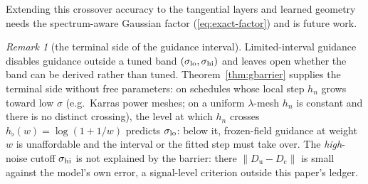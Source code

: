 \documentclass{article} %
\def\eqref#1{equation~\ref{#1}}
\theoremstyle{plain}
\theoremstyle{definition}
\theoremstyle{remark}
\newtheorem{remark}{Remark}
\providecommand{\eexp}{\mathrm{e}}
\providecommand{\Dc}{D_{\mathrm{c}}}
\providecommand{\Du}{D_{\mathrm{u}}}
\def\eqref#1{(\ref{#1})}
\begin{document}
\newcommand{\ProofGCrossAP}{%
On $a=0$ the exact one-step factor (Lemma~\ref{lem:gfactor}) is
$\Phi_n=r^{1+w}\bigl((1+u_n)/(1+r^2u_n)\bigr)^{w/2}$, with $u_n=\sigma_n^2/b$,
$r=\eexp^{-h}$; the fitted factor (Proposition~\ref{prop:gfit-sign}, $A=1$) is
$G_n=\eexp^{-h}(u_n+\eexp^{-wh})/(1+u_n)$.  Writing $y_n=\log u_n$,
$\delta(h,y):=\log(G_n/\Phi_n)
= wh+\log(\eexp^{y}+\eexp^{-wh})-\bigl(1+\tfrac w2\bigr)\log(1+\eexp^{y})
+\tfrac w2\log(1+\eexp^{y-2h})$.
Then $\delta(0,y)=\partial_h\delta(0,y)=0$ (first-order consistency,
Proposition~\ref{prop:gconsist}), and with $F(y)=\eexp^{y}/(1+\eexp^{y})^2$
one has $\partial_h^2\delta=w^2F(y+wh)+2wF(y-2h)\ge0$; hence $\delta\ge0$, so
$\Theta_K=\prod_n\eexp^{\delta(h,y_n)}\ge1$, and Taylor's formula gives
$\delta(h,y_n)=\int_0^h(h-s)\bigl[w^2F(y_n+ws)+2wF(y_n-2s)\bigr]\,ds$.
On the uniform mesh $y_{n+1}=y_n-2h$; since $\int F=1$ and
$\mathrm{TV}(F)=\tfrac12$, the rectangle bound gives $2h\sum_n F(y_n+c)\le1+h$
for every shift $c$, so
$\log\Theta_K\le\int_0^h(h-s)\tfrac{1+h}{2h}(w^2+2w)\,ds=\tfrac{1+h}{4}w(w+2)h$.
Synchronous coupling with $|\xi_K^{\rm ex}|\le|\xi_0|$ (the exact
discriminative factor contracts) gives the $W_2$ bound.
}

Extending this crossover accuracy to the tangential layers and learned
geometry needs the spectrum-aware Gaussian factor \eqref{eq:exact-factor}
and is future work.

\begin{remark}[the terminal side of the guidance interval]\label{rem:interval}
Limited-interval guidance \citep{kynkaanniemi2024interval} disables
guidance outside a tuned band $(\sigma_{\rm lo}, \sigma_{\rm hi})$ and
leaves open whether the band can be derived rather than tuned.
Theorem~\ref{thm:gbarrier} supplies the terminal side without free
parameters: on schedules whose local step $h_n$ grows toward low $\sigma$
(e.g.\ Karras power meshes; on a uniform $\lambda$-mesh $h_n$ is constant and
there is no distinct crossing), the level at which $h_n$ crosses $h_\flat(w)
= \log(1+1/w)$ predicts $\sigma_{\rm lo}$: below it, frozen-field guidance at weight $w$ is
unaffordable and the interval or the fitted step must take over. The \emph{high}-noise cutoff
$\sigma_{\rm hi}$ is not explained by the barrier: there $\|\Du - \Dc\|$ is
small against the model's own error, a signal-level criterion outside this
paper's ledger.
\end{remark}
\end{document}
